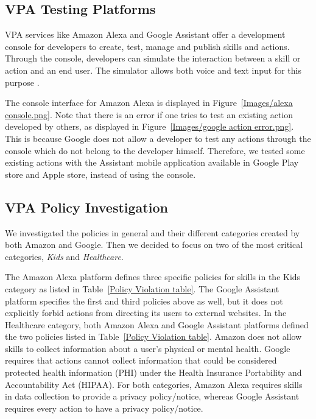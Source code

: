 \documentclass{article}
\begin{document}
\subsection{VPA Testing Platforms}
VPA services like Amazon Alexa and Google Assistant offer a development console for developers to create, test, manage and publish skills and actions. Through the console, developers can simulate the interaction between a skill or action and an end user. The simulator allows both voice and text input for this purpose \cite{skillConsole}. 

The console interface for Amazon Alexa is displayed in Figure~\ref{Images/alexa console.png}. Note that there is an error if one tries to test an existing action developed by others, as displayed in Figure~\ref{Images/google action error.png}. This is because Google does not allow a developer to test any actions through the console which do not belong to the developer himself. Therefore, we tested some existing actions with the Assistant mobile application available in Google Play store and Apple store, instead of using the console.

\subsection{VPA Policy Investigation}

We investigated the policies in general and their different categories created by both Amazon and Google. Then we decided to focus on two of the most critical categories, \textit{Kids} and \textit{Healthcare}. %

The Amazon Alexa platform defines three specific policies for skills in the Kids category as listed in Table~\ref{Policy Violation table}. %
The Google Assistant platform specifies the first and third policies above as well, but it does not explicitly forbid actions from directing its users to external websites\cite{AmazonPolicy}\cite{GooglePolicy}. In the Healthcare category, both Amazon Alexa and Google Assistant platforms defined the two policies listed in Table~\ref{Policy Violation table}. Amazon does not allow skills to collect information about a user's physical or mental health. Google requires that actions cannot collect information that could be considered protected health information (PHI) under the Health Insurance Portability and Accountability Act (HIPAA). For both categories, Amazon Alexa requires skills in data collection to provide a privacy policy/notice, whereas Google Assistant requires every action to have a privacy policy/notice.
\end{document}
